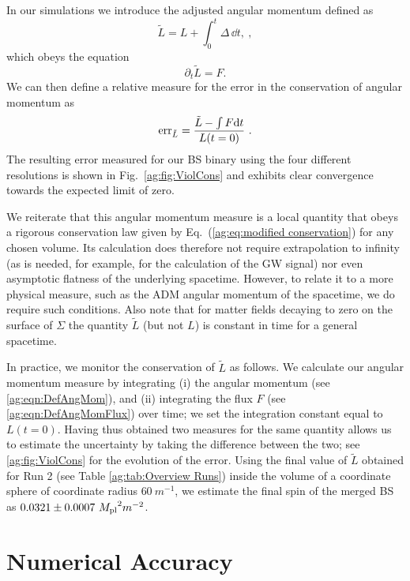 In our simulations we introduce the adjusted angular momentum
defined as
\begin{equation}
 \tilde{L} = {L}+\int_{0}^t {\Delta} \,\dd t, \label{ag:eqn:DefAngMom}~,
\end{equation}
which obeys the equation 
\begin{equation}
\label{ag:eq:modified conservation}\partial_t\tilde{L} = {F}.
\end{equation}
We can then define a relative measure for the error in the
conservation of angular momentum as
\begin{equation}
    {\rm err }_{\tilde{L}} = \frac{\tilde{L} - \int F {\rm d}t}{{L}(t=0)}~.\label{ag:eqn:ang_mom}
\end{equation}
The resulting error measured for our BS binary using the
four different resolutions is shown in Fig.~\ref{ag:fig:ViolCons}
and exhibits clear convergence towards the expected limit of
zero.

We reiterate that this angular momentum measure is a
local quantity that obeys a rigorous conservation law
given by Eq.~(\ref{ag:eq:modified conservation}) for
any chosen volume.
Its calculation does therefore not require extrapolation
to infinity (as is needed, for example, for the calculation
of the GW signal) nor even asymptotic flatness of the underlying spacetime.
However, to relate it to a more physical measure, such as the ADM angular momentum of the spacetime, we do require such conditions.
Also note that for matter fields decaying to zero on the surface of $\Sigma$ the quantity $\tilde{L}$ (but not $L$) is constant in time for a general spacetime. 

In practice, we monitor the conservation of $\tilde{L}$ as follows.
We calculate our angular momentum measure by integrating (i) the angular momentum (see \ref{ag:eqn:DefAngMom}), and (ii) integrating the flux $F$ (see \ref{ag:eqn:DefAngMomFlux}) over time; we set the integration constant equal to ${L}(t=0)$. Having thus obtained two measures for the same quantity allows us to estimate the uncertainty by taking the difference between the two; see \ref{ag:fig:ViolCons} for the evolution of the error. 
Using the final value of $\tilde{L}$ obtained for Run 2
(see Table \ref{ag:tab:Overview Runs}) inside the volume of
a coordinate sphere of coordinate radius $60~m^{-1}$, we estimate the final spin
of the merged BS as $0.0321 \pm 0.0007~{M_{\rm pl}}^2 m^{-2}$.

\section{Numerical Accuracy}
\label{ag:sec:numacc}

